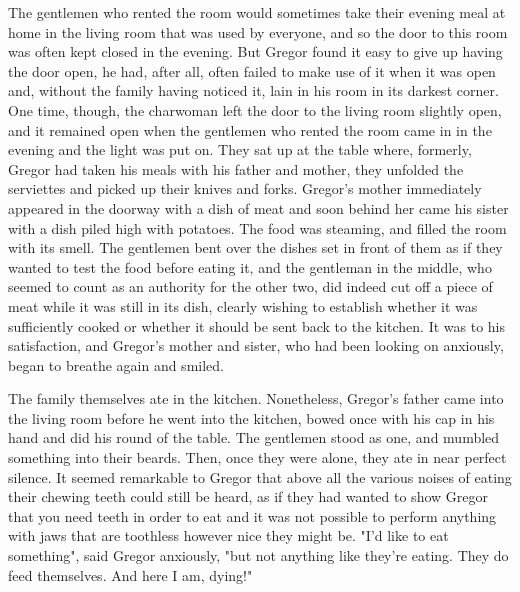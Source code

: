 The gentlemen who rented the room would sometimes take their evening meal at home in the living room that was used by everyone, and so the door to this room was often kept closed in the evening. But Gregor found it easy to give up having the door open, he had, after all, often failed to make use of it when it was open and, without the family having noticed it, lain in his room in its darkest corner. One time, though, the charwoman left the door to the living room slightly open, and it remained open when the gentlemen who rented the room came in in the evening and the light was put on. They sat up at the table where, formerly, Gregor had taken his meals with his father and mother, they unfolded the serviettes and picked up their knives and forks. Gregor's mother immediately appeared in the doorway with a dish of meat and soon behind her came his sister with a dish piled high with potatoes. The food was steaming, and filled the room with its smell. The gentlemen bent over the dishes set in front of them as if they wanted to test the food before eating it, and the gentleman in the middle, who seemed to count as an authority for the other two, did indeed cut off a piece of meat while it was still in its dish, clearly wishing to establish whether it was sufficiently cooked or whether it should be sent back to the kitchen. It was to his satisfaction, and Gregor's mother and sister, who had been looking on anxiously, began to breathe again and smiled.

The family themselves ate in the kitchen. Nonetheless, Gregor's father came into the living room before he went into the kitchen, bowed once with his cap in his hand and did his round of the table. The gentlemen stood as one, and mumbled something into their beards. Then, once they were alone, they ate in near perfect silence. It seemed remarkable to Gregor that above all the various noises of eating their chewing teeth could still be heard, as if they had wanted to show Gregor that you need teeth in order to eat and it was not possible to perform anything with jaws that are toothless however nice they might be. "I'd like to eat something", said Gregor anxiously, "but not anything like they're eating. They do feed themselves. And here I am, dying!"

